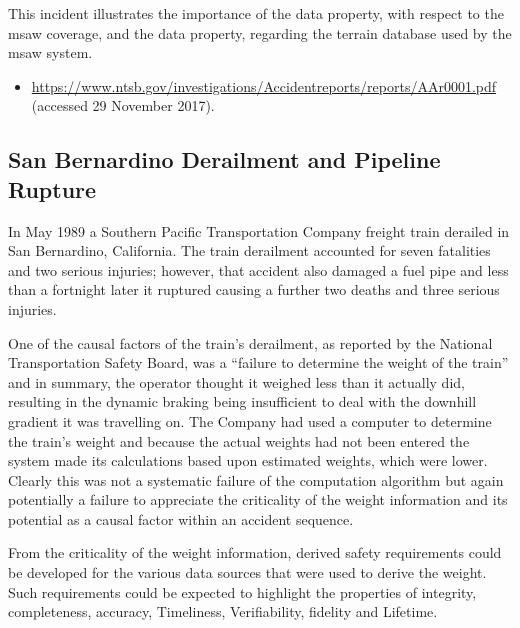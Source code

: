 This incident illustrates the importance of the \gls{data property}, with respect to the \gls{msaw} coverage, and the  \gls{data property},
regarding
the terrain \gls{database} used by the \gls{msaw} system.

\begin{samepage}
\begin{itemize}
	\item \raggedright{\href{https://www.ntsb.gov/investigations/Accidentreports/reports/AAr0001.pdf}{https://www.ntsb.gov/investigations/Accidentreports/reports/AAr0001.pdf} (accessed 29 November 2017).}
\end{itemize}
\end{samepage}

\subsection{San Bernardino Derailment and Pipeline Rupture} \label{bkm:incacc:sanbernardino}
In May 1989 a Southern Pacific Transportation Company freight train derailed in San Bernardino, California. The train derailment accounted for seven fatalities and two serious injuries; however, that accident also damaged a fuel pipe and less than a fortnight later it ruptured causing a further two deaths and three serious injuries.

One of the causal factors of the train’s derailment, as reported by the National Transportation Safety Board, was a ``failure to determine the weight of the train'' and in summary, the operator thought it weighed less than it actually did, resulting in the dynamic braking being insufficient to deal with the downhill gradient it was travelling on. The Company had used a computer to determine the train’s weight and because the actual weights had not been entered the system made its calculations based upon estimated weights, which were lower. Clearly this was not a systematic failure of the computation algorithm but again potentially a failure to appreciate the \gls{criticality} of the weight \gls{information} and its potential as a causal factor within an accident sequence.

From the \gls{criticality} of the weight \gls{information}, derived safety requirements could be developed for the various data sources that were used to derive the weight. Such requirements could be expected to highlight the properties of \gls{integrity}, \gls{completeness}, \gls{accuracy}, Timeliness, Verifiability, \gls{fidelity} and Lifetime.

